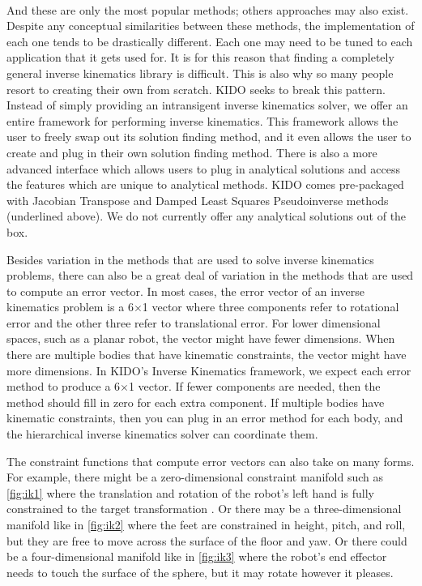 \paragraph{} And these are only the most popular methods; others approaches may also exist. Despite any conceptual similarities between these methods, the implementation of each one tends to be drastically different. Each one may need to be tuned to each application that it gets used for. It is for this reason that finding a completely general inverse kinematics library is difficult. This is also why so many people resort to creating their own from scratch. KIDO seeks to break this pattern. Instead of simply providing an intransigent inverse kinematics solver, we offer an entire framework for performing inverse kinematics. This framework allows the user to freely swap out its solution finding method, and it even allows the user to create and plug in their own solution finding method. There is also a more advanced interface which allows users to plug in analytical solutions and access the features which are unique to analytical methods. KIDO comes pre-packaged with Jacobian Transpose and Damped Least Squares Pseudoinverse methods (underlined above). We do not currently offer any analytical solutions out of the box.

Besides variation in the methods that are used to solve inverse kinematics problems, there can also be a great deal of variation in the methods that are used to compute an error vector. In most cases, the error vector of an inverse kinematics problem is a 6$\times$1 vector where three components refer to rotational error and the other three refer to translational error. For lower dimensional spaces, such as a planar robot, the vector might have fewer dimensions. When there are multiple bodies that have kinematic constraints, the vector might have more dimensions. In KIDO's Inverse Kinematics framework, we expect each error method to produce a 6$\times$1 vector. If fewer components are needed, then the method should fill in zero for each extra component. If multiple bodies have kinematic constraints, then you can plug in an error method for each body, and the hierarchical inverse kinematics solver can coordinate them.

The constraint functions that compute error vectors can also take on many forms. For example, there might be a zero-dimensional constraint manifold such as \ref{fig:ik1} where the translation and rotation of the robot's left hand is fully constrained to the target transformation . Or there may be a three-dimensional manifold like in \ref{fig:ik2} where the feet are constrained in height, pitch, and roll, but they are free to move across the surface of the floor and yaw. Or there could be a four-dimensional manifold like in \ref{fig:ik3} where the robot's end effector needs to touch the surface of the sphere, but it may rotate however it pleases.

